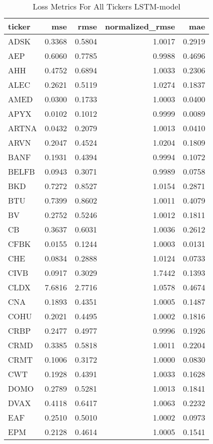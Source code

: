 \begin{table}
\caption{Loss Metrics For All Tickers LSTM-model}
\label{tab:loss_total_lstm}
\begin{tabular}{lrrrr}
\toprule
ticker & mse & rmse & normalized_rmse & mae \\
\midrule
ADSK & 0.3368 & 0.5804 & 1.0017 & 0.2919 \\
AEP & 0.6060 & 0.7785 & 0.9988 & 0.4696 \\
AHH & 0.4752 & 0.6894 & 1.0033 & 0.2306 \\
ALEC & 0.2621 & 0.5119 & 1.0274 & 0.1837 \\
AMED & 0.0300 & 0.1733 & 1.0003 & 0.0400 \\
APYX & 0.0102 & 0.1012 & 0.9999 & 0.0089 \\
ARTNA & 0.0432 & 0.2079 & 1.0013 & 0.0410 \\
ARVN & 0.2047 & 0.4524 & 1.0204 & 0.1809 \\
BANF & 0.1931 & 0.4394 & 0.9994 & 0.1072 \\
BELFB & 0.0943 & 0.3071 & 0.9989 & 0.0758 \\
BKD & 0.7272 & 0.8527 & 1.0154 & 0.2871 \\
BTU & 0.7399 & 0.8602 & 1.0011 & 0.4079 \\
BV & 0.2752 & 0.5246 & 1.0012 & 0.1811 \\
CB & 0.3637 & 0.6031 & 1.0036 & 0.2612 \\
CFBK & 0.0155 & 0.1244 & 1.0003 & 0.0131 \\
CHE & 0.0834 & 0.2888 & 1.0124 & 0.0733 \\
CIVB & 0.0917 & 0.3029 & 1.7442 & 0.1393 \\
CLDX & 7.6816 & 2.7716 & 1.0578 & 0.4674 \\
CNA & 0.1893 & 0.4351 & 1.0005 & 0.1487 \\
COHU & 0.2021 & 0.4495 & 1.0002 & 0.1816 \\
CRBP & 0.2477 & 0.4977 & 0.9996 & 0.1926 \\
CRMD & 0.3385 & 0.5818 & 1.0011 & 0.2204 \\
CRMT & 0.1006 & 0.3172 & 1.0000 & 0.0830 \\
CWT & 0.1928 & 0.4391 & 1.0033 & 0.1628 \\
DOMO & 0.2789 & 0.5281 & 1.0013 & 0.1841 \\
DVAX & 0.4118 & 0.6417 & 1.0063 & 0.2232 \\
EAF & 0.2510 & 0.5010 & 1.0002 & 0.0973 \\
EPM & 0.2128 & 0.4614 & 1.0005 & 0.1541 \\

\end{tabular}
\end{table}
